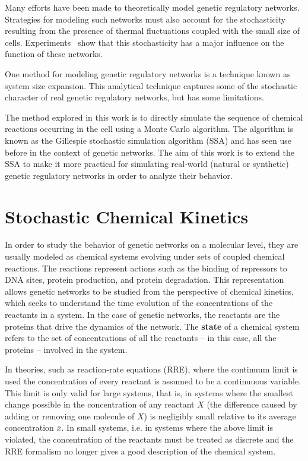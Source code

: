 \documentclass[english,letterpaper,12pt]{article}
\newcommand{\defkeywd}[1]{\textbf{#1}}
\begin{document}
\begin{doublespacing}
Many efforts have been made to theoretically model genetic regulatory networks.  Strategies for modeling such networks must also account for the stochasticity resulting from the presence of thermal fluctuations coupled with the small size of cells. Experiments~\cite{ecoli-decision} show that this stochasticity has a major influence on the function of these networks.

One method for modeling genetic regulatory networks is a technique known as system size expansion. This analytical technique captures some of the stochastic character of real genetic regulatory networks, but has some limitations. 

The method explored in this work is to directly simulate the sequence of chemical reactions occurring in the cell using a Monte Carlo algorithm. The algorithm is known as the Gillespie stochastic simulation algorithm (SSA) and has seen use before in the context of genetic networks.  The aim of this work is to extend the SSA to make it more practical for simulating real-world (natural or synthetic) genetic regulatory networks in order to analyze their behavior.


\section{Stochastic Chemical Kinetics} %
\label{sec:chemkin}

In order to study the behavior of genetic networks on a molecular level,  they are usually modeled as chemical systems evolving under sets of coupled chemical reactions. The reactions represent actions such as the binding of repressors to DNA sites, protein production, and protein degradation. This representation allows genetic networks to be studied from the perspective of chemical kinetics, which seeks to understand the time evolution of the concentrations of the reactants in a system. In the case of genetic networks, the reactants are the proteins that drive the dynamics of the network.  The \defkeywd{state} of a chemical system refers to the set of concentrations of all the reactants -- in this case, all the proteins  -- involved in the system.

In theories, such as reaction-rate equations (RRE), where the continuum limit is used the concentration of every reactant is assumed to be a continuuous variable. This limit is only valid for large systems, that is, in systems where the smallest change possible in the concentration of any reactant $X$ (the difference caused by adding or removing one molecule of $X$) is negligibly small relative to its average concentration $\bar{x}$. In small systems, i.e. in systems where the above limit is violated, the concentration of the reactants must be treated as discrete and the RRE formalism no longer gives a good description of the chemical system.


\end{doublespacing}
\end{document}
